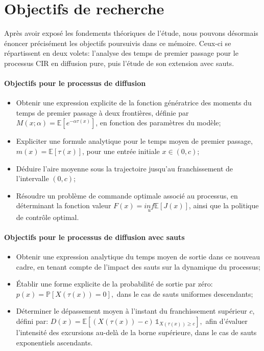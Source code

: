 \section{Objectifs de recherche}  %

Après avoir exposé les fondements théoriques de l'étude, nous pouvons désormais énoncer précisément les objectifs poursuivis dans ce mémoire. Ceux-ci se répartissent en deux volets: l'analyse des temps de premier passage pour le processus \acs{CIR} en diffusion pure, puis l'étude de son extension avec sauts.

\paragraph{Objectifs pour le processus de diffusion}
\begin{itemize}
    \item Obtenir une expression explicite de la fonction génératrice des moments du temps de premier passage à deux frontières, définie par \( M(x;\alpha) = \mathds{E}[e^{-\alpha \tau(x)}] \), en fonction des paramètres du modèle;
    \item Expliciter une formule analytique pour le temps moyen de premier passage, \( m(x) = \mathds{E}[\tau(x)] \), pour une entrée initiale \( x \in (0,c) \);
    \item Déduire l'aire moyenne sous la trajectoire jusqu'au franchissement de l'intervalle \( (0,c) \);
    \item Résoudre un problème de commande optimale associé au processus, en déterminant la fonction valeur \( F(x) = \underset{u}{inf}\mathds{E}[J(x)] \), ainsi que la politique de contrôle optimal.
\end{itemize}

\paragraph{Objectifs pour le processus de diffusion avec sauts}
\begin{itemize}
    \item Obtenir une expression analytique du temps moyen de sortie dans ce nouveau cadre, en tenant compte de l'impact des sauts sur la dynamique du processus;
    \item Établir une forme explicite de la probabilité de sortie par zéro:
    \(
    p(x) = \mathds{P}[X(\tau(x)) = 0],
    \)
    dans le cas de sauts uniformes descendants;
    \item Déterminer le dépassement moyen à l'instant du franchissement supérieur \( c \), défini par:
    \(
    D(x) = \mathds{E}[(X(\tau(x)) - c)\, \mathds{1}_{X(\tau(x)) \geq c}],
    \)
    afin d'évaluer l'intensité des excursions au-delà de la borne supérieure, dans le cas de sauts exponentiels ascendants.
\end{itemize}


